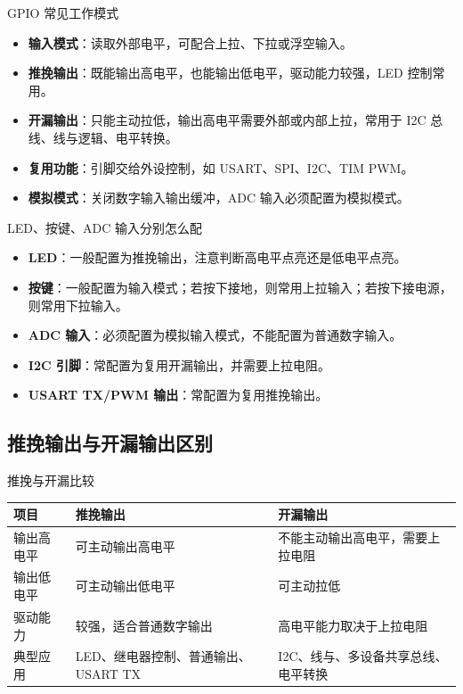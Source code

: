 \documentclass[UTF8,fontset=none,12pt]{ctexart}
\begin{document}
\begin{pointbox}{GPIO 常见工作模式}
\begin{itemize}
  \item \textbf{输入模式}：读取外部电平，可配合上拉、下拉或浮空输入。
  \item \textbf{推挽输出}：既能输出高电平，也能输出低电平，驱动能力较强，LED 控制常用。
  \item \textbf{开漏输出}：只能主动拉低，输出高电平需要外部或内部上拉，常用于 I2C 总线、线与逻辑、电平转换。
  \item \textbf{复用功能}：引脚交给外设控制，如 USART、SPI、I2C、TIM PWM。
  \item \textbf{模拟模式}：关闭数字输入输出缓冲，ADC 输入必须配置为模拟模式。
\end{itemize}
\end{pointbox}

\begin{pointbox}{LED、按键、ADC 输入分别怎么配}
\begin{itemize}
  \item \textbf{LED}：一般配置为推挽输出，注意判断高电平点亮还是低电平点亮。
  \item \textbf{按键}：一般配置为输入模式；若按下接地，则常用上拉输入；若按下接电源，则常用下拉输入。
  \item \textbf{ADC 输入}：必须配置为模拟输入模式，不能配置为普通数字输入。
  \item \textbf{I2C 引脚}：常配置为复用开漏输出，并需要上拉电阻。
  \item \textbf{USART TX/PWM 输出}：常配置为复用推挽输出。
\end{itemize}
\end{pointbox}

\subsection{推挽输出与开漏输出区别}
\begin{pointbox}{推挽与开漏比较}
\begin{tabularx}{\linewidth}{@{}p{3cm}p{5.5cm}Y@{}}
\toprule
\textbf{项目} & \textbf{推挽输出} & \textbf{开漏输出} \\
\midrule
输出高电平 & 可主动输出高电平 & 不能主动输出高电平，需要上拉电阻 \\
输出低电平 & 可主动输出低电平 & 可主动拉低 \\
驱动能力 & 较强，适合普通数字输出 & 高电平能力取决于上拉电阻 \\
典型应用 & LED、继电器控制、普通输出、USART TX & I2C、线与、多设备共享总线、电平转换 \\
\bottomrule
\end{tabularx}
\end{pointbox}
\end{document}
